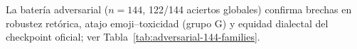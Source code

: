   \item La batería adversarial ($n=144$, 122/144 aciertos globales) confirma brechas en robustez retórica, atajo emoji--toxicidad (grupo G) y equidad dialectal del checkpoint oficial; ver Tabla~\ref{tab:adversarial-144-families}.
